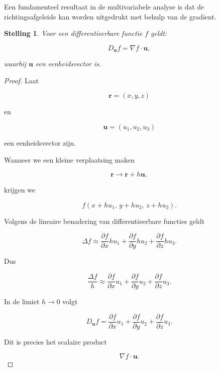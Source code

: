 \documentclass[11pt,a4paper]{article}
\newtheorem{theorem}{Stelling}[section]
\begin{document}
    Een fundamenteel resultaat in de multivariabele analyse is dat de
    richtingsafgeleide kan worden uitgedrukt met behulp van de gradient.

    \begin{theorem}
        Voor een differentieerbare functie $f$ geldt:

        \[
            D_{\mathbf{u}} f = \nabla f \cdot \mathbf{u},
        \]

        waarbij $\mathbf{u}$ een eenheidsvector is.
    \end{theorem}

    \begin{proof}

        Laat

        \[
            \mathbf{r} = (x,y,z)
        \]

        en

        \[
            \mathbf{u} = (u_1,u_2,u_3)
        \]

        een eenheidsvector zijn.

        Wanneer we een kleine verplaatsing maken

        \[
            \mathbf{r} \rightarrow \mathbf{r}+h\mathbf{u},
        \]

        krijgen we

        \[
            f(x+hu_1,\,y+hu_2,\,z+hu_3).
        \]

        Volgens de lineaire benadering van differentieerbare functies geldt

        \[
            \Delta f
            \approx
            \frac{\partial f}{\partial x}hu_1
            +
            \frac{\partial f}{\partial y}hu_2
            +
            \frac{\partial f}{\partial z}hu_3.
        \]

        Dus

        \[
            \frac{\Delta f}{h}
            \approx
            \frac{\partial f}{\partial x}u_1
            +
            \frac{\partial f}{\partial y}u_2
            +
            \frac{\partial f}{\partial z}u_3.
        \]

        In de limiet $h\to0$ volgt

        \[
            D_{\mathbf{u}} f
            =
            \frac{\partial f}{\partial x}u_1
            +
            \frac{\partial f}{\partial y}u_2
            +
            \frac{\partial f}{\partial z}u_3.
        \]

        Dit is precies het scalaire product

        \[
            \nabla f \cdot \mathbf{u}.
        \]

    \end{proof}
\end{document}
